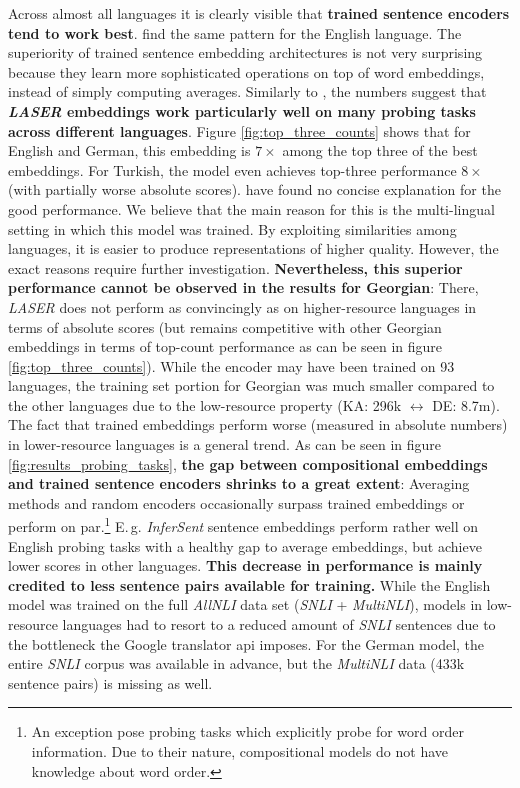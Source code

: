  Across almost all languages it is clearly visible that \textbf{trained sentence encoders tend to work best}. \citep{Conneau.2018a} find the same pattern for the English language. The superiority of trained sentence embedding architectures is not very surprising because they learn more sophisticated operations on top of word embeddings, instead of simply computing averages. Similarly to \citep{Krasnowska.2019}, the numbers suggest that \textbf{\textit{LASER} embeddings work particularly well on many probing tasks across different languages}. Figure \vref{fig:top_three_counts} shows that for English and German, this embedding is $7\times$ among the top three of the best embeddings. For Turkish, the model even achieves top-three performance $8\times$ (with partially worse absolute scores). \citep{Krasnowska.2019} have found no concise explanation for the good performance. We believe that the main reason for this is the multi-lingual setting in which this model was trained. By exploiting similarities among languages, it is easier to produce representations of higher quality. However, the exact reasons require further investigation. \textbf{Nevertheless, this superior performance cannot be observed in the results for Georgian}: There, \textit{LASER} does not perform as convincingly as on higher-resource languages in terms of absolute scores (but remains competitive with other Georgian embeddings in terms of top-count performance as can be seen in figure \vref{fig:top_three_counts}). While the encoder may have been trained on 93 languages, the training set portion for Georgian was much smaller compared to the other languages due to the low-resource property (KA: 296k $\leftrightarrow$ DE: 8.7m). The fact that trained embeddings perform worse (measured in absolute numbers) in lower-resource languages is a general trend. As can be seen in figure \vref{fig:results_probing_tasks}, \textbf{the gap between compositional embeddings and trained sentence encoders shrinks to a great extent}: Averaging methods and random encoders occasionally surpass trained embeddings or perform on par.\footnote{An exception pose probing tasks which explicitly probe for word order information. Due to their nature, compositional models do not have knowledge about word order.} E.\,g. \textit{InferSent} sentence embeddings perform rather well on English probing tasks with a healthy gap to average embeddings, but achieve lower scores in other languages. \textbf{This decrease in performance is mainly credited to less sentence pairs available for training.} While the English model was trained on the full \textit{AllNLI} data set (\textit{SNLI} + \textit{MultiNLI}), models in low-resource languages had to resort to a reduced amount of \textit{SNLI} sentences due to the bottleneck the Google translator \gls{api} imposes. For the German model, the entire \textit{SNLI} corpus was available in advance, but the \textit{MultiNLI} data (433k sentence pairs) is missing as well.

